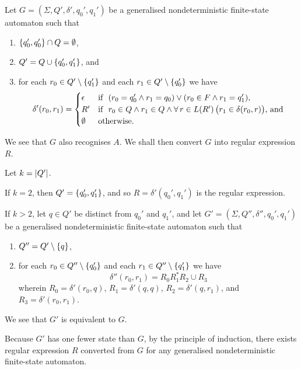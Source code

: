     Let \(G = (\Sigma, Q', \delta', q_0', q_1')\) be a generalised
    nondeterministic finite-state automaton such that
    \begin{enumerate}
        \item \(\{q_0', q_0'\} \cap Q = \emptyset\),
        \item \(Q' = Q \cup \{q_0', q_1'\}\), and
        \item for each \(r_0 \in Q' \setminus \{q_1'\}\) and each \(r_1 \in Q'
        \setminus \{q_0'\}\) we have
            \[
                \delta'(r_0, r_1) = \begin{cases}
                        \epsilon & \text{if }\ (r_0 = q_0' \land r_1 = q_0) \lor
                        (r_0 \in F \land r_1 = q_1'),\\
                        R' & \text{if }\ r_0 \in Q \land r_1 \in Q \land \forall
                        \, r \in L(R') \, \big(r_1 \in \delta(r_0, r)\big)
                        \text{, and}\\
                        \emptyset & \text{otherwise.}
                    \end{cases}
            \]
    \end{enumerate}
    We see that \(G\) also recognises \(A\). We shall then convert \(G\) into
    regular expression \(R\).

    Let \(k = \lvert Q'\rvert\).

    If \(k = 2\), then \(Q' = \{q_0', q_1'\}\), and so \(R = \delta'(q_0',
    q_1')\) is the regular expression.

    If \(k > 2\), let \(q \in Q'\) be distinct from \(q_0'\) and \(q_1'\), and
    let \(G' = (\Sigma, Q'', \delta'', q_0', q_1')\) be a generalised
    nondeterministic finite-state automaton such that
    \begin{enumerate}
        \item \(Q'' = Q' \setminus \{q\}\),
        \item for each \(r_0 \in Q'' \setminus \{q_0'\}\) and each \(r_1 \in
        Q'' \setminus \{q_1'\}\) we have
        \[
            \delta''(r_0, r_1) = R_0 R_1^* R_2 \cup R_3
        \]
        wherein \(R_0 = \delta'(r_0, q)\), \(R_1 = \delta'(q, q)\), \(R_2 =
        \delta'(q, r_1)\), and \(R_3 = \delta'(r_0, r_1)\).
    \end{enumerate}
    We see that \(G'\) is equivalent to \(G\).

    Because \(G'\) has one fewer state than \(G\), by the principle of
    induction, there exists regular expression \(R\) converted from \(G\) for
    any generalised nondeterministic finite-state automaton.

